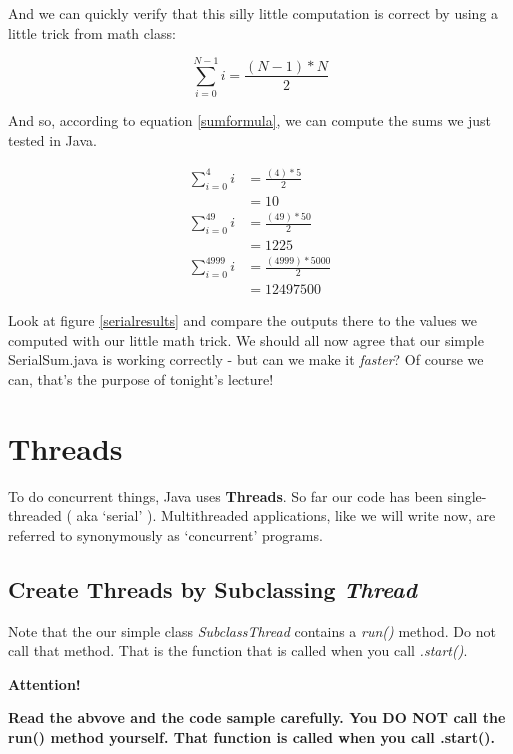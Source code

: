 \documentclass[12pt]{article}
\begin{document}
And we can quickly verify that this silly little computation is correct by using
a little trick from math class:

\begin{equation}
\label{sumformula}
	\sum_{i=0}^{N-1}i = \frac{(N-1)*N}{2}
\end{equation}

And so, according to equation \ref{sumformula}, we can compute the sums we just
tested in Java.

\begin{align*}
	\sum_{i=0}^{4}i &= \frac{(4)*5}{2} \\
					&= 10 \\
	\sum_{i=0}^{49}i &= \frac{(49)*50}{2} \\
					 &= 1225 \\
	\sum_{i=0}^{4999}i &= \frac{(4999)*5000}{2} \\
					&= 12497500
\end{align*}

Look at figure \ref{serialresults} and compare the outputs there to the values
we computed with our little math trick. We should all now agree that our simple
SerialSum.java is working correctly - but can we make it \textit{faster}? Of
course we can, that's the purpose of tonight's lecture!

\section{Threads}
To do concurrent things, Java uses \textbf{Threads}. So far our code has been
single-threaded ( aka `serial' ). Multithreaded applications, like we will write
now, are referred to synonymously as `concurrent' programs.

\subsection{Create Threads by Subclassing \textit{Thread}}

Note that the our simple class \textit{SubclassThread} contains a \textit{run()}
method. Do not call that method. That is the function that is called when you
call \textit{.start()}. 


\begin{center}
{\Large\textbf{Attention!}}

\textbf{Read the abvove and the code sample
carefully. You DO NOT call the run() method yourself. That function is called
when you call .start().}
\end{center}
\end{document}
